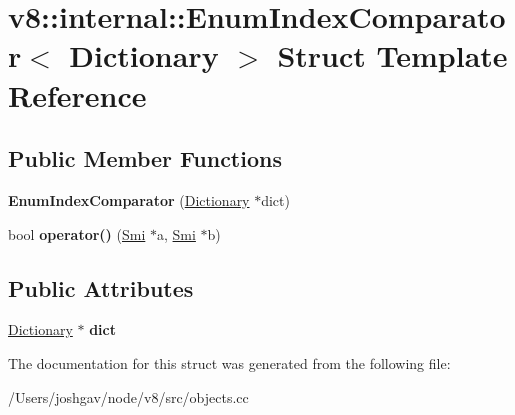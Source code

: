 \hypertarget{structv8_1_1internal_1_1_enum_index_comparator}{}\section{v8\+:\+:internal\+:\+:Enum\+Index\+Comparator$<$ Dictionary $>$ Struct Template Reference}
\label{structv8_1_1internal_1_1_enum_index_comparator}
\subsection*{Public Member Functions}
\begin{DoxyCompactItemize}
\item 
{\bfseries Enum\+Index\+Comparator} (\hyperlink{classv8_1_1internal_1_1_dictionary}{Dictionary} $\ast$dict)\hypertarget{structv8_1_1internal_1_1_enum_index_comparator_ad11df7fe11b2efc7dbf63a831e796542}{}\label{structv8_1_1internal_1_1_enum_index_comparator_ad11df7fe11b2efc7dbf63a831e796542}

\item 
bool {\bfseries operator()} (\hyperlink{classv8_1_1internal_1_1_smi}{Smi} $\ast$a, \hyperlink{classv8_1_1internal_1_1_smi}{Smi} $\ast$b)\hypertarget{structv8_1_1internal_1_1_enum_index_comparator_ac060778f42d95c705c35c21aab5b85c6}{}\label{structv8_1_1internal_1_1_enum_index_comparator_ac060778f42d95c705c35c21aab5b85c6}

\end{DoxyCompactItemize}
\subsection*{Public Attributes}
\begin{DoxyCompactItemize}
\item 
\hyperlink{classv8_1_1internal_1_1_dictionary}{Dictionary} $\ast$ {\bfseries dict}\hypertarget{structv8_1_1internal_1_1_enum_index_comparator_a2459d0b77389e021cf2a1d0177e57e18}{}\label{structv8_1_1internal_1_1_enum_index_comparator_a2459d0b77389e021cf2a1d0177e57e18}

\end{DoxyCompactItemize}


The documentation for this struct was generated from the following file\+:\begin{DoxyCompactItemize}
\item 
/\+Users/joshgav/node/v8/src/objects.\+cc\end{DoxyCompactItemize}
